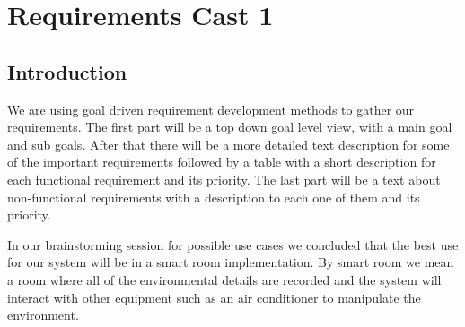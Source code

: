 \documentclass[../document]{subfiles}
\begin{document}
\section{Requirements Cast 1}
\subsection{Introduction}
We are using goal driven requirement development methods to gather our requirements. The first part will be a top down goal level view, with a main goal and sub goals. After that there will be a more detailed text description for some of the important requirements followed by a table with a short description for each functional requirement and its priority. The last part will be a text about non-functional requirements with a description to each one of them and its priority.

In our brainstorming session for possible use cases we concluded that the best use for our system will be in a smart room implementation. By smart room we mean a room where all of the environmental details are recorded and the system will interact with other equipment such as an air conditioner to manipulate the environment.
\end{document}

